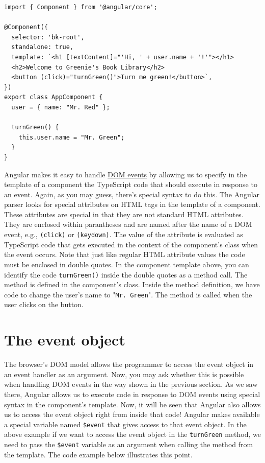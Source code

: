 \documentclass{report}
\begin{document}
\begin{Verbatim}[label=v2.1.4]
import { Component } from '@angular/core';

@Component({
  selector: 'bk-root',
  standalone: true,
  template: `<h1 [textContent]="'Hi, ' + user.name + '!'"></h1>
  <h2>Welcome to Greenie's Book Library</h2>
  <button (click)="turnGreen()">Turn me green!</button>`,
})
export class AppComponent {
  user = { name: "Mr. Red" };

  turnGreen() {
    this.user.name = "Mr. Green";
  }
}
\end{Verbatim}

Angular makes it easy to handle \href{https://developer.mozilla.org/en-US/docs/Web/Events#event_listing}{DOM events} by allowing us to specify in the template of a component the TypeScript code that should execute in response to an event. Again, as you may guess, there's special syntax to do this. The Angular parser looks for special attributes on HTML tags in the template of a component. These attributes are special in that they are not standard HTML attributes. They are enclosed within parantheses and are named after the name of a DOM event, e.g., \verb|(click)| or \verb|(keydown)|. The value of the attribute is evaluated as TypeScript code that gets executed in the context of the component's class when the event occurs. Note that just like regular HTML attribute values the code must be enclosed in double quotes. In the component template above, you can identify the code \verb|turnGreen()| inside the double quotes as a method call. The method is defined in the component's class. Inside the method definition, we have code to change the user's name to "\texttt{Mr. Green}". The method is called when the user clicks on the button.

\section{The event object}
The browser's DOM model allows the programmer to access the event object in an event handler as an argument. Now, you may ask whether this is possible when handling DOM events in the way shown in the previous section. As we saw there, Angular allows us to execute code in response to DOM events using special syntax in the component's template. Now, it will be seen that Angular also allows us to access the event object right from inside that code! Angular makes available a special variable named \verb|$event| that gives access to that event object. In the above example if we want to access the event object in the \verb|turnGreen| method, we need to pass the \verb|$event| variable as an argument when calling the method from the template. The code example below illustrates this point.
\end{document}
